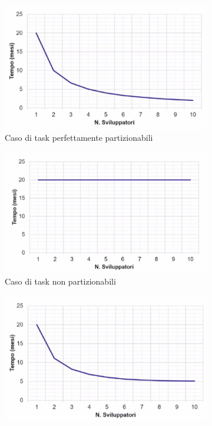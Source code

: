 \begin{figure}[H]
	\centering
	\begin{subfigure}{.24\textwidth}
		\centering
		\includegraphics[width=\linewidth]{document/img/noint.PNG}
		\caption{Caso di task perfettamente partizionabili}
	\end{subfigure}%
	\begin{subfigure}{.24\textwidth}
		\centering
		\includegraphics[width=\linewidth]{document/img/nopart.PNG}
		\caption{Caso di task non partizionabili}
	\end{subfigure}%
	\begin{subfigure}{.24\textwidth}
		\centering
		\includegraphics[width=\linewidth]{document/img/comu.PNG}

\end{subfigure}
\end{figure}
